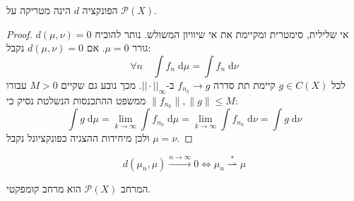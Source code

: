\documentclass{tstextbook}
\begin{document}
\begin{lemma}
הפונקציה \(d\) הינה מטריקה על \(\mathcal{P}(X)\).

\end{lemma}
\begin{proof}
אי שלילית, סימטרית ומקיימת את אי שיוויון המשולש. נותר להוכיח \(d\left( \mu,\nu \right)=0\) גורר \(\mu=0\). אם \(d\left( \mu,\nu \right)=0\) נקבל:
$$\forall n \quad \int f_{n} \;\mathrm{d} \mu = \int f_{n} \;\mathrm{d} \nu  $$
לכל \(g \in C(X)\) קיימת תת סדרה \(f_{n_{k}}\to g\) ב-\(||\cdot||_{\infty}\). מכך נובע גם שקיים \(M>0\) עבורו \(\lVert f_{n_{k}} \rVert,\lVert g \rVert \leq M\)
ממשפט ההתכנסות הנשלטת נסיק כי:
$$\int g \;\mathrm{d} \mu =\lim_{ k \to \infty } \int f_{n_{k}} \;\mathrm{d} \mu =\lim_{ k \to \infty } \int f_{n_{k}} \;\mathrm{d} \nu = \int  g \;\mathrm{d} \nu  $$
ולכן מיחידות ההצגיה כפונקציונל נקבל \(\mu=\nu\).

\end{proof}
\begin{remark}
$$d\left( \mu_{n},\mu \right)\xrightarrow{n\to \infty} 0 \iff \mu_{n} \overset{*}{\rightharpoonup} \mu$$

\end{remark}
\begin{proposition}
המרחב \(\mathcal{P}(X)\) הוא מרחב קומפקטי.

\end{proposition}
\end{document}
